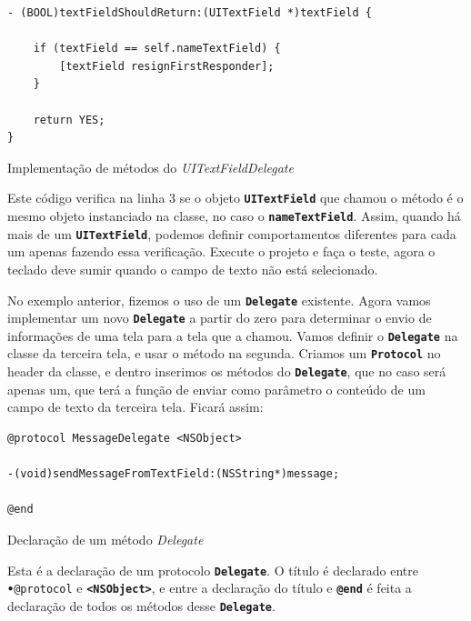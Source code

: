 \documentclass[a4paper,12pt,brazil,oneside]{book}
\begin{document}
\begin{listing}[H]
\begin{verbatim}
- (BOOL)textFieldShouldReturn:(UITextField *)textField {
    
    if (textField == self.nameTextField) {
        [textField resignFirstResponder];
    }
    
    return YES;
}
\end{verbatim}
\caption{Implementação de métodos do \emph{UITextFieldDelegate}}
\end{listing}


Este código verifica na linha 3 se o objeto \texttt{\textbf{UITextField}} que chamou o método é o mesmo objeto instanciado na classe, no caso o \texttt{\textbf{nameTextField}}. Assim, quando há mais de um \texttt{\textbf{UITextField}}, podemos definir comportamentos diferentes para cada um apenas fazendo essa verificação. Execute o projeto e faça o teste, agora o teclado deve sumir quando o campo de texto não está selecionado.

No exemplo anterior, fizemos o uso de um \texttt{\textbf{Delegate}} existente. Agora vamos implementar um novo \texttt{\textbf{Delegate}} a partir do zero para determinar o envio de informações de uma tela para a tela que a chamou. Vamos definir o \texttt{\textbf{Delegate}} na classe da terceira tela, e usar o método na segunda. Criamos um \texttt{\textbf{Protocol}} no header da classe, e dentro inserimos os métodos do \texttt{\textbf{Delegate}}, que no caso será apenas um, que terá a função de enviar como parâmetro o conteúdo de um campo de texto da terceira tela. Ficará assim:

\begin{listing}[H]
\begin{verbatim}
@protocol MessageDelegate <NSObject>

-(void)sendMessageFromTextField:(NSString*)message;

@end
\end{verbatim}
\caption{Declaração de um método \emph{Delegate}}
\end{listing}


Esta é a declaração de um protocolo \texttt{\textbf{Delegate}}. O título é declarado entre \texttt{\textbf{•}{@protocol}} e \texttt{\textbf{<NSObject>}}, e entre a declaração do título e \texttt{\textbf{@end}} é feita a declaração de todos os métodos desse \texttt{\textbf{Delegate}}.
\end{document}
